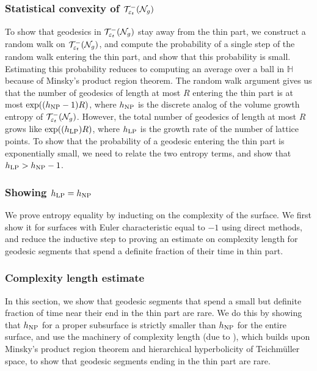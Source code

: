 \subsubsection*{Statistical convexity of $\mathcal{T}_{\varepsilon_t}^{-}(\mathcal{N}_g)$}
To show that geodesics in $\mathcal{T}_{\varepsilon_t}^{-}(\mathcal{N}_g)$ stay away from the thin part, we construct a random walk on $\mathcal{T}_{\varepsilon_t}^{-}(\mathcal{N}_g)$, and compute the probability of a single step of the random walk entering the thin part, and show that this probability is small.
Estimating this probability reduces to computing an average over a ball in $\mathbb{H}$ because of Minsky's product region theorem.
The random walk argument gives us that the number of geodesics of length at most $R$ entering the thin part is at most $\exp((h_{\mathrm{NP}} - 1)R)$, where $h_{\mathrm{NP}}$ is the discrete analog of the volume growth entropy of $\mathcal{T}_{\varepsilon_t}^{-}(\mathcal{N}_g)$.
However, the total number of geodesics of length at most $R$ grows like $\exp((h_{\mathrm{LP}})R)$, where $h_{\mathrm{LP}}$ is the growth rate of the number of lattice points.
To show that the probability of a geodesic entering the thin part is exponentially small, we need to relate the two entropy terms, and show that $h_{\mathrm{LP}} > h_{\mathrm{NP}} - 1$.

\subsubsection*{Showing $h_{\mathrm{LP}} = h_{\mathrm{NP}}$}
We prove entropy equality by inducting on the complexity of the surface.
We first show it for surfaces with Euler characteristic equal to $-1$ using direct methods, and reduce the inductive step to proving an estimate on complexity length for geodesic segments that spend a definite fraction of their time in thin part.

\subsubsection*{Complexity length estimate}

In this section, we
show that geodesic segments that spend a small but definite fraction of time near their end in the thin part are rare.
We do this by showing that $h_{\mathrm{NP}}$ for a proper subsurface is strictly smaller than $h_{\mathrm{NP}}$ for the entire surface, and use the machinery of complexity length (due to \textcite{dowdall2023lattice}), which builds upon Minsky's product region theorem and hierarchical hyperbolicity of Teichmüller space, to show that geodesic segments ending in the thin part are rare.

